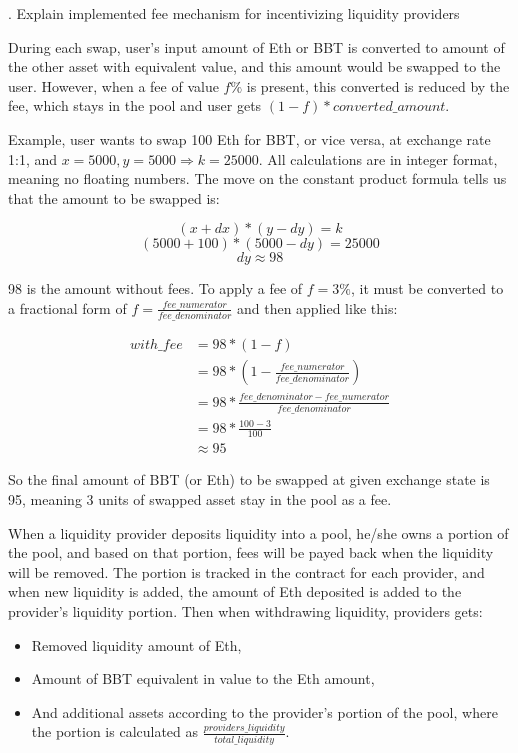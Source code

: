 \documentclass[11pt,a4paper]{article}
\newcounter{question}
\newcommand\Que[1]{
   \leavevmode\par
   \stepcounter{question}
   \noindent
   \thequestion. #1\par}
\newcommand\Ans[2][]{
    \leavevmode\par\noindent
   {\leftskip37pt
    \textbf{#1}#2\par}}
\begin{document}
\Que{Explain implemented fee mechanism for incentivizing liquidity providers}
\Ans{
During each swap, user's input amount of Eth or BBT is converted to amount of the
other asset with equivalent value, and this amount would be swapped to the user.
However, when a fee of value $f\%$ is present, this converted is reduced by
the fee, which stays in the pool and user gets $(1 - f) * converted\_amount$.

Example, user wants to swap 100 Eth for BBT, or vice versa, at exchange rate 1:1,
and $x = 5000, y = 5000 \Rightarrow k = 25000$. All calculations are in integer
format, meaning no floating numbers. The move on the constant product
formula tells us that the amount to be swapped is:

\[(x + dx) * (y - dy) = k\]
\[(5000 + 100) * (5000 - dy) = 25000\]
\[dy \approx 98\]

98 is the amount without fees. To apply a fee of $f = 3\%$, it must be converted to
a fractional form of $f = \frac{fee\_numerator}{fee\_denominator}$ and then applied
like this:

\begin{equation}
    \begin{aligned}
        with\_fee & = 98 * (1 - f)\\
        & = 98 * (1 - \frac{fee\_numerator}{fee\_denominator})\\
        & = 98 * \frac{fee\_denominator - fee\_numerator}{fee\_denominator}\\
        & = 98 * \frac{100 - 3}{100}\\
        & \approx 95
    \end{aligned}
\end{equation}

So the final amount of BBT (or Eth) to be swapped at given exchange state is 95,
meaning 3 units of swapped asset stay in the pool as a fee.

When a liquidity provider deposits liquidity into a pool, he/she owns a portion
of the pool, and based on that portion, fees will be payed back when the liquidity
will be removed. The portion is tracked in the contract for each provider, and
when new liquidity is added, the amount of Eth deposited is added to the provider's
liquidity portion. Then when withdrawing liquidity, providers gets:

\begin{itemize}
    \item Removed liquidity amount of Eth,
    \item Amount of BBT equivalent in value to the Eth amount,
    \item And additional assets according to the provider's portion of the pool,
        where the portion is calculated as $\frac{providers\_liquidity}{total\_liquidity}$.
\end{itemize}
}
\end{document}
